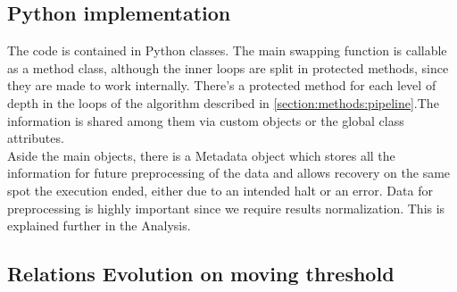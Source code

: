 \subsection{Python implementation}
The code is contained in Python classes. The main swapping function is callable as a method class, although the inner loops are split in protected methods, since they are made to work internally. There’s a protected method for each level of depth in the loops of the algorithm described in \ref{section:methods:pipeline}.The information is shared among them via custom objects or the global class attributes.
\\

Aside the main objects, there is a Metadata object which stores all the information for future preprocessing of the data and allows recovery on the same spot the execution ended, either due to an intended halt or an error.
Data for preprocessing is highly important since we require results normalization. This is explained further in the Analysis.

\subsection{Relations Evolution on moving threshold}
\label{suppl:relations}

